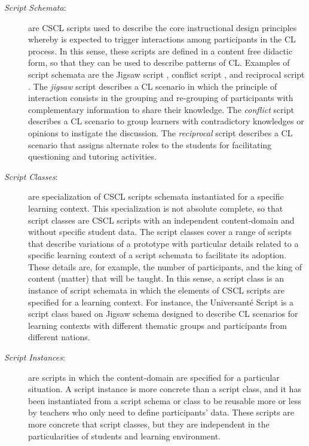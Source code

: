 \begin{description}
\item[\emph{Script Schemata}:] are CSCL scripts used to describe the core instructional design principles whereby is expected to trigger interactions among participants in the CL process.
In this sense, these scripts are defined in a content free didactic form, so that they can be used to describe patterns of CL.
Examples of script schemata are the Jigsaw script \cite{Aronson1978, KordakiSiempos2010}, conflict script \cite{WeinbergerErtlFischerMandl2005}, and reciprocal script \cite{King2007}.
The \emph{jigsaw} script describes a CL scenario in which the principle of interaction consists in the grouping and re-grouping of participants with complementary information to share their knowledge.
The \emph{conflict} script describes a CL scenario to group learners with contradictory knowledges or opinions to instigate the discussion.
The \emph{reciprocal} script describes a CL scenario that assigns alternate roles to the students for facilitating questioning and tutoring activities.

\item[\emph{Script Classes}:] are specialization of CSCL scripts schemata instantiated for a specific learning context.
This specialization is not absolute complete, so that script classes are CSCL scripts with an independent content-domain and without specific student data.
The script classes cover a range of scripts that describe variations of a prototype with particular details related to a specific learning context of a script schemata to facilitate its adoption.
These details are, for example, the number of participants, and the king of content (matter) that will be taught.
In this sense, a script class is an instance of script schemata in which the elements of CSCL scripts are specified for a learning context.
For instance, the Universanté Script \cite{DillenbourgJermann2007} is a script class based on Jigsaw schema designed to describe CL scenarios for learning contexts with different thematic groups and participants from different nations.

\item[\emph{Script Instances}:] are scripts in which the content-domain are specified for a particular situation.
A script instance is more concrete than a script class, and it has been instantiated from a script schema or class to be reusable more or less by teachers who only need to define participants' data.
These scripts are more concrete that script classes, but they are independent in the particularities of students and learning environment.


\end{description}
